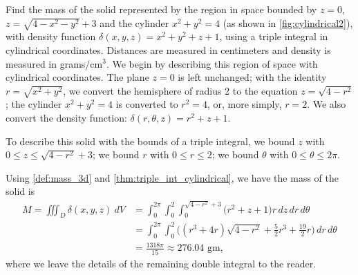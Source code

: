 \begin{example}\label{ex_cylindrical2}
Find the mass of the solid represented by the region in space bounded by $z=0$, $z=\sqrt{4-x^2-y^2}+3$ and the cylinder $x^2+y^2=4$ (as shown in \autoref{fig:cylindrical2}), with density function $\delta(x,y,z) = x^2+y^2+z+1$, using a triple integral in cylindrical coordinates. Distances are measured in centimeters and density is measured in grams/cm$^3$.
\solution
We begin by describing this region of space with cylindrical coordinates. The plane $z=0$ is left unchanged; with the identity $r=\sqrt{x^2+y^2}$, we convert the hemisphere of radius 2 to the equation $z=\sqrt{4-r^2}$; the cylinder $x^2+y^2=4$ is converted to $r^2=4$, or, more simply, $r=2$.  We also convert the density function: $\delta(r,\theta,z) = r^2+z+1$.

To describe this solid with the bounds of a triple integral, we bound $z$ with $0\leq z\leq \sqrt{4-r^2}+3$; we bound $r$ with $0 \leq r \leq 2$; we bound $\theta$ with $0 \leq \theta \leq 2\pi$.

Using \autoref{def:mass_3d} and \autoref{thm:triple_int_cylindrical}, we have the mass of the solid is
\begin{align*}
M=\iiint_D\delta(x,y,z)\ dV &= \int_0^{2\pi}\int_0^2\int_0^{\sqrt{4-r^2}+3}\bigl(r^2+z+1\bigr)r\,dz\,dr\,d\theta \\
&= \int_0^{2\pi}\int_0^2\bigl((r^3+4r)\sqrt{4-r^2}+\frac52r^3+\frac{19}2r\bigr)\,dr\,d\theta \\
&= \frac{1318\pi}{15} \approx 276.04\text{ gm},
\end{align*}
where we leave the details of the remaining double integral to the reader.
\end{example}

